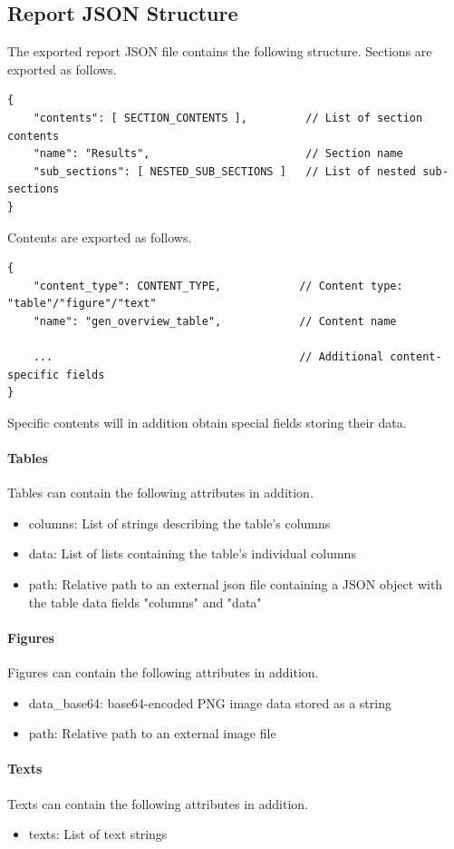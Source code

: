 \subsection{Report JSON Structure}
\label{sec:report_json_struct}

The exported report JSON file contains the following structure. Sections are exported as follows.

\begin{lstlisting}[basicstyle=\small\ttfamily]
{
    "contents": [ SECTION_CONTENTS ],         // List of section contents
    "name": "Results",                        // Section name
    "sub_sections": [ NESTED_SUB_SECTIONS ]   // List of nested sub-sections
}
\end{lstlisting}

Contents are exported as follows.

\begin{lstlisting}[basicstyle=\small\ttfamily]
{
    "content_type": CONTENT_TYPE,            // Content type: "table"/"figure"/"text"
    "name": "gen_overview_table",            // Content name 
    
    ...                                      // Additional content-specific fields
}
\end{lstlisting}

Specific contents will in addition obtain special fields storing their data.

\paragraph{Tables} Tables can contain the following attributes in addition.

\begin{itemize}  
  \item columns: List of strings describing the table's columns
  \item data: List of lists containing the table's individual columns
  \item path: Relative path to an external json file containing a JSON object with the table data fields "columns" and "data"
\end{itemize}

\paragraph{Figures} Figures can contain the following attributes in addition.

\begin{itemize}  
  \item data\_base64: base64-encoded PNG image data stored as a string
  \item path: Relative path to an external image file
\end{itemize}

\paragraph{Texts} Texts can contain the following attributes in addition.

\begin{itemize}  
  \item texts: List of text strings
\end{itemize}
